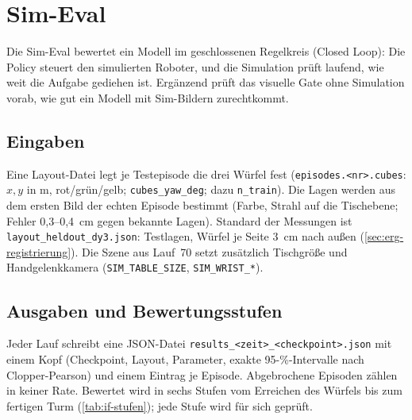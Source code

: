 \section{Sim-Eval}
\label{sec:if-sim}
\label{sec:validierung}
\label{sec:eval-methodik}

Die Sim-Eval bewertet ein Modell im geschlossenen Regelkreis (Closed Loop): Die Policy steuert
den simulierten Roboter, und die Simulation prüft laufend, wie weit die Aufgabe gediehen ist.
Ergänzend prüft das visuelle Gate ohne Simulation vorab, wie gut ein Modell mit Sim-Bildern
zurechtkommt.

\subsection{Eingaben}
\label{sec:if-sim-eingaben}

Eine Layout-Datei legt je Testepisode die drei Würfel fest
(\texttt{episodes.<nr>.cubes}: $x,y$ in m, rot/grün/gelb; \texttt{cubes\_yaw\_deg}; dazu
\texttt{n\_train}). Die Lagen werden aus dem ersten Bild der echten Episode bestimmt (Farbe,
Strahl auf die Tischebene; Fehler 0,3--0,4~cm gegen bekannte Lagen). Standard der Messungen ist
\texttt{layout\_heldout\_dy3.json}: Testlagen, Würfel je Seite 3~cm nach außen
(\cref{sec:erg-registrierung}). Die Szene aus Lauf~70 setzt zusätzlich Tischgröße und
Handgelenkkamera (\texttt{SIM\_TABLE\_SIZE}, \texttt{SIM\_WRIST\_*}).

\subsection{Ausgaben und Bewertungsstufen}
\label{sec:if-sim-ausgaben}

Jeder Lauf schreibt eine JSON-Datei \texttt{results\_<zeit>\_<checkpoint>.json}
mit einem Kopf (Checkpoint, Layout, Parameter, exakte 95-\%-Intervalle nach Clopper-Pearson)
und einem Eintrag je Episode. Abgebrochene Episoden zählen in keiner Rate. Bewertet wird in
sechs Stufen vom Erreichen des Würfels bis zum fertigen Turm (\cref{tab:if-stufen}); jede Stufe
wird für sich geprüft.


